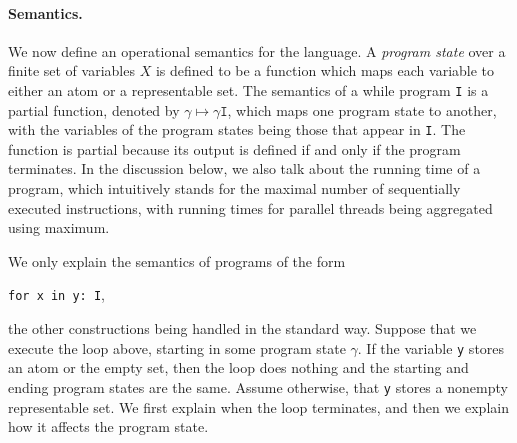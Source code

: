 \paragraph*{Semantics.}
	We  now define an operational semantics  for the language.  A  \emph{program state} over a finite set of variables $X$ is defined to be a function which maps each variable to either an atom or a representable set. 
	The semantics of a while program   \texttt{I} is a partial function, denoted by $\gamma \mapsto  \gamma \mathtt I$, which maps one program state to another, with the variables of the program states being those that appear in \texttt{I}.   The function is partial because its output  is  defined if and only if  the program terminates.  In  the discussion below, we also talk about  the running time of a program, which intuitively stands for the maximal number of sequentially executed instructions, with running times for parallel threads being aggregated using maximum.


We only explain the semantics of programs of the form
\begin{center}
	\texttt{for x in y: I},
\end{center} the other constructions being handled in the standard way. 
Suppose that
we execute the  loop above, starting  in some program state $\gamma$. If the variable \texttt{y} stores an atom or the empty set, then the  loop does nothing and the starting and ending  program states are the same. Assume otherwise, that \texttt{y} stores a nonempty  representable set. We first explain when the loop terminates, and then we explain how it affects the program state.

